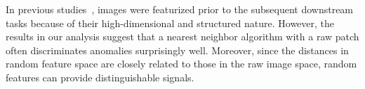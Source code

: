\documentclass[runningheads]{llncs}
\begin{document}
In previous studies~\cite{jigsaw,colorization}, images were featurized prior to the subsequent downstream tasks because of their high-dimensional and structured nature.
However, the results in our analysis suggest that a nearest neighbor algorithm with a raw patch often discriminates anomalies surprisingly well.
Moreover, since the distances in random feature space are closely related to those in the raw image space, random features can provide distinguishable signals.

 




\clearpage
\appendix


\setcounter{section}{0}
\renewcommand\thesection{A\arabic{section}}
\setcounter{table}{0}
\renewcommand{\thetable}{A\arabic{table}}
\setcounter{figure}{0}
\renewcommand{\thefigure}{A\arabic{figure}}
\setcounter{equation}{0}
\renewcommand{\theequation}{A\arabic{equation}}
\end{document}
